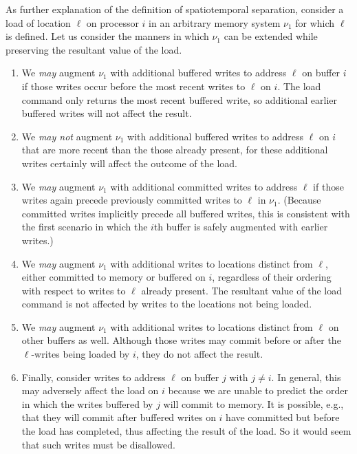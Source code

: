 \documentclass[11pt]{report}
\begin{document}
As further explanation of the definition of spatiotemporal separation, consider a load of location $\ell$ on processor $i$ in an arbitrary memory system $\nu_1$ for which $\ell$ is defined. Let us consider the manners in which $\nu_1$ can be extended while preserving the resultant value of the load. \begin{enumerate}
  \item We \emph{may} augment $\nu_1$ with additional buffered writes to address $\ell$ on buffer $i$ if those writes occur before the most recent writes to $\ell$ on $i$. The load command only returns the most recent buffered write, so additional earlier buffered writes will not affect the result. 
  
  \item We \emph{may not} augment $\nu_1$ with additional buffered writes to address $\ell$ on $i$ that are more recent than the those already present, for these additional writes certainly will affect the outcome of the load. 
  
  \item We \emph{may} augment $\nu_1$ with additional committed writes to address $\ell$ if those writes again precede previously committed writes to $\ell$ in $\nu_1$. (Because committed writes implicitly precede all buffered writes, this is consistent with the first scenario in which the $i$th buffer is safely augmented with earlier writes.)
  
  \item We \emph{may} augment $\nu_1$ with additional writes to locations distinct from $\ell$, either committed to memory or buffered on $i$, regardless of their ordering with respect to writes to $\ell$ already present. The resultant value of the load command is not affected by writes to the locations not being loaded.  
  
  \item We \emph{may} augment $\nu_1$ with additional writes to locations distinct from $\ell$ on other buffers as well. Although those writes may commit before or after the $\ell$-writes being loaded by $i$, they do not affect the result. 
  
  \item Finally, consider writes to address $\ell$ on buffer $j$ with $j \neq i$. In general, this may adversely affect the load on $i$ because we are unable to predict the order in which the writes buffered by $j$ will commit to memory. It is possible, e.g., that they will commit after buffered writes on $i$ have committed but before the load has completed, thus affecting the result of the load. So it would seem that such writes must be disallowed. 
  

\end{enumerate}
\end{document}

